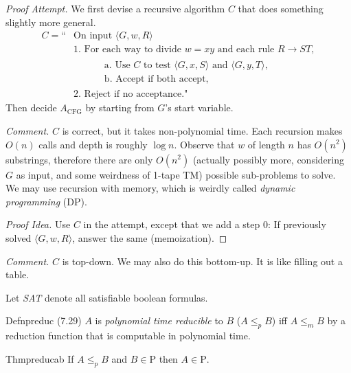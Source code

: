 \textit{Proof Attempt.}
We first devise a recursive algorithm $C$ that does something slightly more general.
\begin{align*}
  C=\text{``} & \text{On input }\langle G,w,R\rangle                                                          \\
              & \text{1. For each way to divide }w=xy\text{ and each rule }R\to ST,                           \\
              & \begin{aligned}
                  \qquad & \text{a. Use }C\text{ to test }\langle G,x,S\rangle\text{ and }\langle G,y,T\rangle, \\
                         & \text{b. Accept if both accept,}
                \end{aligned} \\
              & \text{2. Reject if no acceptance."}
\end{align*}
Then decide \( A_{\text{CFG}} \) by starting from \( G \)'s start variable.

\textit{Comment.} \( C \) is correct, but it takes non-polynomial time. Each recursion makes \( O(n) \) calls and depth is roughly \( \log n \). Observe that $w$ of length $n$ has $O(n^2)$ substrings, therefore there are only $O(n^2)$ (actually possibly more, considering $G$ as input, and some weirdness of 1-tape TM) possible sub-problems to solve. We may use recursion with memory, which is weirdly called \emph{dynamic programming} (DP).

\begin{proof}[Proof Idea]
  Use $C$ in the attempt, except that we add a step 0: If previously solved $\langle G,w,R\rangle$, answer the same (memoization).
\end{proof}

\textit{Comment.} $C$ is top-down. We may also do this bottom-up. It is like filling out a table.

Let \textit{SAT} denote all satisfiable boolean formulas.

\begin{reference}{Defn}{preduc}
  (7.29) $A$ is \emph{polynomial time reducible} to $B$ ($A\leq_p B$) iff $A\leq_m B$ by a reduction function that is computable in polynomial time.
\end{reference}

\begin{reference}{Thm}{preducab}
  If $A\leq_pB$ and $B\in \mathrm{P}$ then $A\in \mathrm{P}$.
\end{reference}

